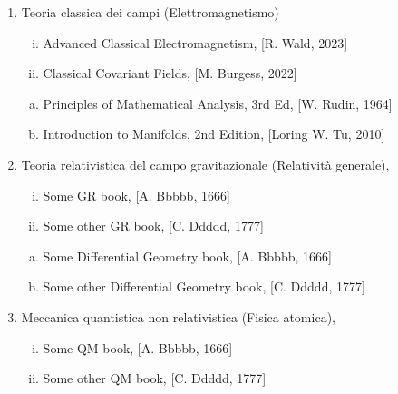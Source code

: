 \begin{enumerate}[I]
\item Teoria classica dei campi (Elettromagnetismo)
\begin{enumerate}[(i)]
\item Advanced Classical Electromagnetism, [R. Wald, 2023]
\item Classical Covariant Fields, [M. Burgess, 2022]
\end{enumerate} 
\begin{enumerate}[(a)]
\item Principles of Mathematical Analysis, 3rd Ed, [W. Rudin, 1964]
\item Introduction to Manifolds, 2nd Edition, [Loring W. Tu, 2010]
\end{enumerate} 
\item Teoria relativistica del campo gravitazionale (Relatività generale),
\begin{enumerate}[(i)]
\item Some GR book, [A. Bbbbb, 1666]
\item Some other GR book, [C. Ddddd, 1777]
\end{enumerate} 
\begin{enumerate}[(a)]
\item Some Differential Geometry book, [A. Bbbbb, 1666]
\item Some other Differential Geometry book, [C. Ddddd, 1777]
\end{enumerate} 
\item Meccanica quantistica non relativistica (Fisica atomica),
\begin{enumerate}[(i)]
\item Some QM book, [A. Bbbbb, 1666]
\item Some other QM book, [C. Ddddd, 1777]
\end{enumerate} 
\begin{enumerate}[(a)]

\end{enumerate}
\end{enumerate}

